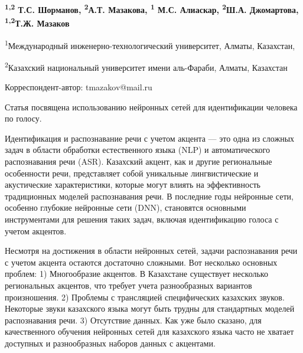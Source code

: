 
\begin{articleheader}

{\bfseries \textsuperscript{1,2} Т.С. Шорманов, \textsuperscript{2}А.Т.
Мазакова, \textsuperscript{1} М.С. Алиаскар, \textsuperscript{2}Ш.А.
Джомартова,}
{\bfseries \textsuperscript{1,2}Т.Ж. Мазаков\textsuperscript{\envelope }}
\end{articleheader}

\begin{affiliation}
\textsuperscript{1}Международный инженерно-технологический университет,
Алматы, Казахстан,

\textsuperscript{2}Казахский национальный университет имени аль-Фараби,
Алматы, Казахстан

\raggedright {\bfseries \textsuperscript{\envelope }}Корреспондент-автор: tmazakov@mail.ru
\end{affiliation}

Статья посвящена использованию нейронных сетей для идентификации
человека по голосу.

Идентификация и распознавание речи с учетом акцента --- это одна из
сложных задач в области обработки естественного языка (NLP) и
автоматического распознавания речи (ASR). Казахский акцент, как и другие
региональные особенности речи, представляет собой уникальные
лингвистические и акустические характеристики, которые могут влиять на
эффективность традиционных моделей распознавания речи. В последние годы
нейронные сети, особенно глубокие нейронные сети (DNN), становятся
основными инструментами для решения таких задач, включая идентификацию
голоса с учетом акцентов.

Несмотря на достижения в области нейронных сетей, задачи распознавания
речи с учетом акцента остаются достаточно сложными. Вот несколько
основных проблем: 1) Многообразие акцентов. В Казахстане существует
несколько региональных акцентов, что требует учета разнообразных
вариантов произношения. 2) Проблемы с трансляцией специфических
казахских звуков. Некоторые звуки казахского языка могут быть трудны для
стандартных моделей распознавания речи. 3) Отсутствие данных. Как уже
было сказано, для качественного обучения нейронных сетей для казахского
языка часто не хватает доступных и разнообразных наборов данных с
акцентами.

